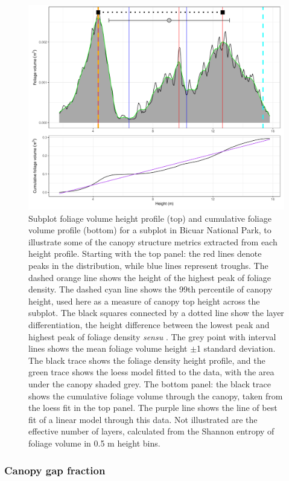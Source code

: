 \documentclass[11pt,a4paper]{article}
\begin{document}
\begin{figure}[H]
\centering
	\includegraphics[width=\textwidth]{height_profile_illus_all}
	\caption{Subplot foliage volume height profile (top) and cumulative foliage volume profile (bottom) for a subplot in Bicuar National Park, to illustrate some of the canopy structure metrics extracted from each height profile. Starting with the top panel: the red lines denote peaks in the distribution, while blue lines represent troughs. The dashed orange line shows the height of the highest peak of foliage density. The dashed cyan line shows the 99th percentile of canopy height, used here as a measure of canopy top height across the subplot. The black squares connected by a dotted line show the layer differentiation, the height difference between the lowest peak and highest peak of foliage density \textit{sensu} \citet{Palace2015}. The grey point with interval lines shows the mean foliage volume height $\pm$1 standard deviation. The black trace shows the foliage density height profile, and the green trace shows the loess model fitted to the data, with the area under the canopy shaded grey. The bottom panel: the black trace shows the cumulative foliage volume through the canopy, taken from the loess fit in the top panel. The purple line shows the line of best fit of a linear model through this data. Not illustrated are the effective number of layers, calculated from the Shannon entropy of foliage volume in 0.5 m height bins.}
	\label{height_profile_illus}
\end{figure}


\subsubsection{Canopy gap fraction}
\end{document}

